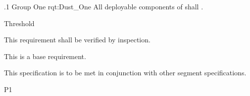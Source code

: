 \ONERQMTVKSA
{\RqtNumberBase.1}
{Group One}
{rqt:Dust_One}
{All deployable components of \ThisSys shall \TBD.}
{
	\item [Phase 1] Threshold
}
{This requirement shall be verified by inspection.}
{
\item [N/A] This is a base requirement.
}
{
	\item This specification is to be met in conjunction with other segment specifications.
}
{P1}

